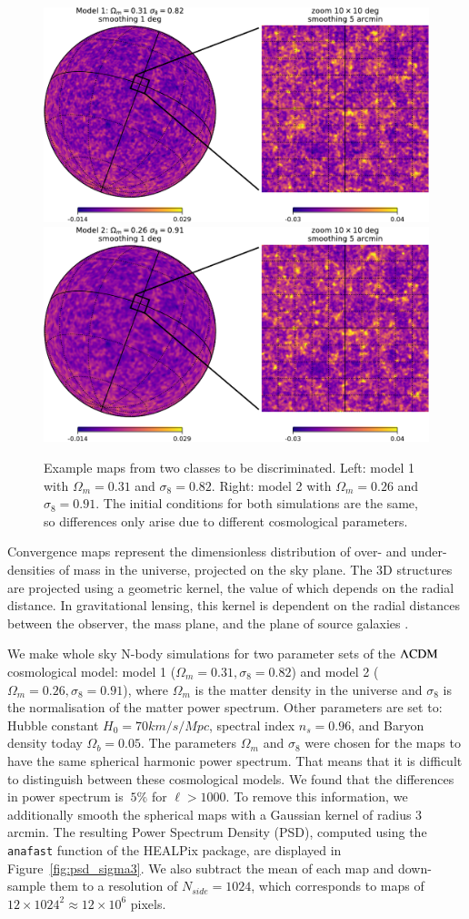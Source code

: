 \documentclass[final,twocolumn,3p,times,sort&compress]{elsarticle}
\newcommand{\figref}[1]{Figure~\ref{fig:#1}}
\newcommand{\1}{\b{1}}              %
\newcommand{\0}{\b{0}}              %
\begin{document}
\begin{figure}
	\centering
	\includegraphics[width=0.48\linewidth]{figure_kappa_diff_model1}
	\hfill
	\includegraphics[width=0.48\linewidth]{figure_kappa_diff_model2}
	\caption{Example maps from two classes to be discriminated. Left: model 1 with $\Omega_m=0.31$ and $\sigma_8=0.82$. Right: model 2 with $\Omega_m=0.26$ and $\sigma_8=0.91$.
	The initial conditions for both simulations are the same, so differences only arise due to different cosmological parameters.}
	\label{fig:map_sample}
\end{figure}

Convergence maps represent the dimensionless distribution of over- and under-densities of mass in the universe, projected on the sky plane.
The 3D structures are projected using a geometric kernel, the value of which depends on the radial distance.
In gravitational lensing, this kernel is dependent on the radial distances between the observer, the mass plane, and the plane of source galaxies \citep[see][for a review of gravitational lensing]{bartelman2010gravitationallensing}.

We make whole sky N-body simulations for two parameter sets of the $\Lambda\rm{CDM}$ cosmological model: model 1 ($\Omega_m=0.31, \sigma_8=0.82$) and model 2 ($\Omega_m=0.26, \sigma_8=0.91$), where $\Omega_m$ is the matter density in the universe and $\sigma_8$ is the normalisation of the matter power spectrum.
Other parameters are set to: Hubble constant $H_0=70 km/s/Mpc$, spectral index $n_s=0.96$, and Baryon density today $\Omega_b=0.05$.
The parameters $\Omega_m$ and $\sigma_8$ were chosen for the maps to have the same spherical harmonic power spectrum.
That means that it is difficult to distinguish between these cosmological models.
We found that the differences in power spectrum is $~5\%$ for $\ell>1000$.
To remove this information, we additionally smooth the spherical maps with a Gaussian kernel of radius $3$ arcmin.
The resulting Power Spectrum Density (PSD), computed using the \texttt{anafast} function of the HEALPix package, are displayed in \figref{psd_sigma3}.
We also subtract the mean of each map and down-sample them to a resolution of $N_{side}=1024$, which corresponds to maps of $12 \times 1024^2 \approx 12 \times 10^6$ pixels.
\end{document}

